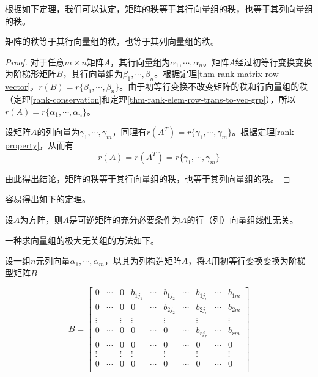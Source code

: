 根据如下定理，我们可以认定，矩阵的秩等于其行向量组的秩，也等于其列向量组的秩。

\begin{thm}
    \label{thm-matrix-rank-is-vec-grp-rank}
    矩阵的秩等于其行向量组的秩，也等于其列向量组的秩。
\end{thm}

\begin{proof}
    对于任意$m\times n$矩阵$A$，其行向量组为$\alpha_1,\cdots,\alpha_n$。矩阵$A$经过初等行变换变换为阶梯形矩阵$B$，其行向量组为$\beta_1,\cdots,\beta_n$。根据定理\ref{thm-rank-matrix-row-vector}，$r(B)=r\{\beta_1,\cdots,\beta_n\}$。由于初等行变换不改变矩阵的秩和行向量组的秩（定理\ref{rank-conservation}和定理\ref{thm-rank-elem-row-trans-to-vec-grp}），所以$r(A)=r\{\alpha_1,\cdots,\alpha_n\}$。

    设矩阵$A$的列向量为$\gamma_1,\cdots,\gamma_m$，同理有$r(A^T)=r\{\gamma_1,\cdots,\gamma_m\}$。根据定理\ref{rank-property}，从而有
    \[ r(A)=r(A^T)=r\{\gamma_1,\cdots,\gamma_m\} \]

    由此得出结论，矩阵的秩等于其行向量组的秩，也等于其列向量组的秩。
\end{proof}

容易得出如下的定理。

\begin{thm}
    \label{thm-matrix-invertiable-iff-vec-independence}
    设$A$为方阵，则$A$是可逆矩阵的充分必要条件为$A$的行（列）向量组线性无关。
\end{thm}

一种求向量组的极大无关组的方法如下。

设一组$n$元列向量$\alpha_1,\cdots,\alpha_m$，以其为列构造矩阵$A$，将$A$用初等行变换变换为阶梯型矩阵$B$

\[
    B=\begin{bmatrix}
        0 & \cdots & 0 & b_{1j_1} & \cdots & b_{1j_2} & \cdots & b_{1j_r} & \cdots & b_{1m} \\
        0 & \cdots & 0 & 0 & \cdots & b_{2j_2} & \cdots & b_{2j_r} & \cdots & b_{2m} \\
        \vdots&&\vdots & \vdots && \vdots &        & \vdots &        & \vdots \\
        0 & \cdots & 0 & 0 & \cdots & 0      & \cdots & b_{rj_r} & \cdots & b_{rm} \\
        0 & \cdots & 0 & 0 & \cdots & 0      & \cdots & 0      & \cdots & 0      \\
        \vdots&&\vdots & \vdots && \vdots &        & \vdots &        & \vdots \\
        0 & \cdots & 0 & 0 & \cdots & 0      & \cdots & 0      & \cdots & 0      \\
    \end{bmatrix}
\]

